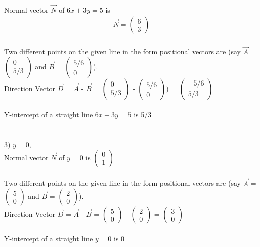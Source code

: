 \documentclass[journal,12pt,twocolumn]{IEEEtran}
\newcommand{\myvec}[1]{\ensuremath{\begin{pmatrix}#1\end{pmatrix}}}
\begin{document}
\\
Normal vector $\vec{N}$ of $ 6x  + 3y = 5 $ is   \begin{align}
	\vec{N} = \myvec{ 6 \\ 3 }
\end{align}
\\
	Two different points on the given line in the form positional vectors are (say $\vec{A}$ = \myvec{ 0 \\ 5/3 } and $\vec{B}$ = \myvec{ 5/6 \\ 0 }).\\
Direction Vector $\vec{D}$ = $\vec{A}$ - $\vec{B}$ = \myvec{ 0 \\ 5/3 } - \myvec{ 5/6 \\ 0 }) = \myvec{ -5/6 \\ 5/3 }
\\
\\
Y-intercept of a straight line $ 6x  + 3y =  5 $ is 5/3
\\
\\
\\
3) $ y =  0,$
\\
Normal vector $\vec{N}$ of $ y = 0 $ is   \myvec{ 0 \\ 1 }
\\
\\
	Two different points on the given line in the form positional vectors are (say $\vec{A}$ = \myvec{ 5 \\ 0 } and $\vec{B}$ = \myvec{ 2 \\ 0 }).\\
Direction Vector $\vec{D}$ = $\vec{A}$ - $\vec{B}$ = \myvec{ 5 \\ 0 } - \myvec{ 2 \\ 0 } = \myvec{ 3 \\ 0 }
\\
\\
Y-intercept of a straight line $ y =  0 $ is 0
\end{document}
